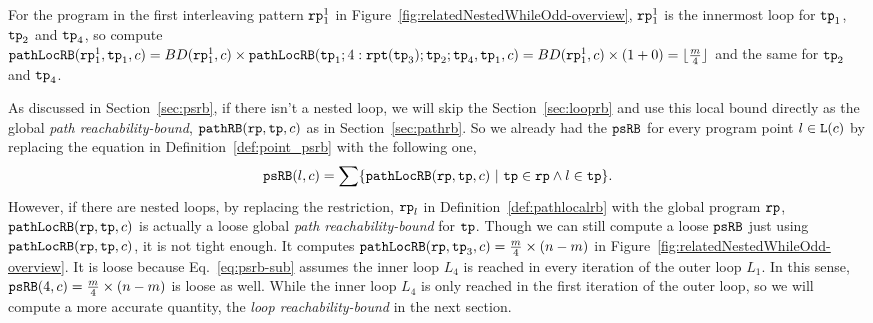 For the program in the first interleaving pattern $\mathtt{rp}_1^1$ in Figure~\ref{fig:relatedNestedWhileOdd-overview}, $\mathtt{rp}_1^1$ is the innermost loop for $\mathtt{tp}_1$, $\mathtt{tp}_2$ and $\mathtt{tp}_4$, 
 so compute $\mathtt{pathLocRB}(\mathtt{rp}_1^1, \mathtt{tp}_1, c) = BD(\mathtt{rp}_1^1, c) \times \mathtt{pathLocRB}(\mathtt{tp}_1; 4:\mathtt{rpt}(\mathtt{tp}_3); \mathtt{tp}_2; \mathtt{tp}_4, \mathtt{tp}_1, c)
 = BD(\mathtt{rp}_1^1, c) \times (1 + 0) = \lfloor \frac{m}{4} \rfloor $ and the same for $\mathtt{tp}_2$ and $\mathtt{tp}_4$.

 As discussed in Section~\ref{sec:psrb}, if there isn't a nested loop, we will skip the Section~\ref{sec:looprb} and use this local bound directly as the global \emph{path reachability-bound}, $\mathtt{pathRB}(\mathtt{rp}, \mathtt{tp}, c)$ as in Section~\ref{sec:pathrb}. 
 So we already had the $\mathtt{psRB}$ for every program point $l \in \mathtt{L}(c)$ by replacing the equation in Definition~\ref{def:point_psrb} with the following one,
 \begin{equation}
 \label{eq:psrb-sub}
 \psRB(l, c) = 
 \sum
 \left\{ \outinB(\rprog, \tpath, c) ~\vert~ \tpath \in \rprog \land 
 l \in \tpath \right\}.
 \end{equation}
 However, if there are nested loops, 
 by replacing the restriction, $\mathtt{rp}_l$ in Definition~\ref{def:pathlocalrb} with the global program $\mathtt{rp}$, $\mathtt{pathLocRB}(\mathtt{rp}, \mathtt{tp}, c)$ is actually a loose global \emph{path reachability-bound} for $\mathtt{tp}$. Though we can still compute a loose $\mathtt{psRB}$ just using $\mathtt{pathLocRB}(\mathtt{rp}, \mathtt{tp}, c)$, it is not tight enough. 
It computes
$\mathtt{pathLocRB}(\mathtt{rp}, \mathtt{tp}_3, c) = \frac{m}{4} \times (n - m)$ in Figure~\ref{fig:relatedNestedWhileOdd-overview}.
It is loose because Eq.~\ref{eq:psrb-sub} assumes the inner loop $L_4$ is reached in every iteration of the outer loop $L_1$. In this sense, $\mathtt{psRB}(4, c) = \frac{m}{4} \times (n - m)$ is loose as well.
While the inner loop $L_4$ is only reached in the first iteration of the outer loop,
so we will compute a more accurate quantity, the \emph{loop reachability-bound} in the next section.